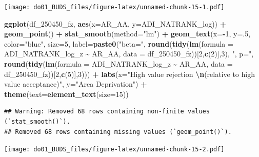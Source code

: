 \documentclass[
]{article}
\newenvironment{Shaded}{\begin{snugshade}}{\end{snugshade}}
\newcommand{\AttributeTok}[1]{\textcolor[rgb]{0.13,0.29,0.53}{#1}}
\newcommand{\DecValTok}[1]{\textcolor[rgb]{0.00,0.00,0.81}{#1}}
\newcommand{\FunctionTok}[1]{\textcolor[rgb]{0.13,0.29,0.53}{\textbf{#1}}}
\newcommand{\NormalTok}[1]{#1}
\newcommand{\SpecialCharTok}[1]{\textcolor[rgb]{0.81,0.36,0.00}{\textbf{#1}}}
\newcommand{\StringTok}[1]{\textcolor[rgb]{0.31,0.60,0.02}{#1}}
\begin{document}
\texttt{[image: do01\_BUDS\_files/figure-latex/unnamed-chunk-15-1.pdf]}

\begin{Shaded}
\begin{Highlighting}[]
\FunctionTok{ggplot}\NormalTok{(df\_250450\_fz, }\FunctionTok{aes}\NormalTok{(}\AttributeTok{x=}\NormalTok{AR\_AA, }\AttributeTok{y=}\NormalTok{ADI\_NATRANK\_log)) }\SpecialCharTok{+}
  \FunctionTok{geom\_point}\NormalTok{() }\SpecialCharTok{+}
  \FunctionTok{stat\_smooth}\NormalTok{(}\AttributeTok{method=}\StringTok{"lm"}\NormalTok{) }\SpecialCharTok{+}
  \FunctionTok{geom\_text}\NormalTok{(}\AttributeTok{x=}\SpecialCharTok{{-}}\DecValTok{1}\NormalTok{, }\AttributeTok{y=}\NormalTok{.}\DecValTok{5}\NormalTok{, }\AttributeTok{color=}\StringTok{"blue"}\NormalTok{, }\AttributeTok{size=}\DecValTok{5}\NormalTok{, }\AttributeTok{label=}\FunctionTok{paste0}\NormalTok{(}\StringTok{"beta="}\NormalTok{,}
       \FunctionTok{round}\NormalTok{(}\FunctionTok{tidy}\NormalTok{(}\FunctionTok{lm}\NormalTok{(}\AttributeTok{formula =}\NormalTok{ ADI\_NATRANK\_log\_z }\SpecialCharTok{\textasciitilde{}}\NormalTok{ AR\_AA, }\AttributeTok{data =}\NormalTok{ df\_250450\_fz))[}\DecValTok{2}\NormalTok{,}\FunctionTok{c}\NormalTok{(}\DecValTok{2}\NormalTok{)],}\DecValTok{3}\NormalTok{),}
       \StringTok{", p="}\NormalTok{, }
       \FunctionTok{round}\NormalTok{(}\FunctionTok{tidy}\NormalTok{(}\FunctionTok{lm}\NormalTok{(}\AttributeTok{formula =}\NormalTok{ ADI\_NATRANK\_log\_z }\SpecialCharTok{\textasciitilde{}}\NormalTok{ AR\_AA, }\AttributeTok{data =}\NormalTok{ df\_250450\_fz))[}\DecValTok{2}\NormalTok{,}\FunctionTok{c}\NormalTok{(}\DecValTok{5}\NormalTok{)],}\DecValTok{3}\NormalTok{))) }\SpecialCharTok{+}
    \FunctionTok{labs}\NormalTok{(}\AttributeTok{x=}\StringTok{"High value rejection }\SpecialCharTok{\textbackslash{}n}\StringTok{(relative to high value acceptance)"}\NormalTok{,}
       \AttributeTok{y=}\StringTok{"Area Deprivation"}\NormalTok{) }\SpecialCharTok{+}
  \FunctionTok{theme}\NormalTok{(}\AttributeTok{text=}\FunctionTok{element\_text}\NormalTok{(}\AttributeTok{size=}\DecValTok{15}\NormalTok{))}
\end{Highlighting}
\end{Shaded}

\begin{verbatim}
## Warning: Removed 68 rows containing non-finite values (`stat_smooth()`).
## Removed 68 rows containing missing values (`geom_point()`).
\end{verbatim}

\texttt{[image: do01\_BUDS\_files/figure-latex/unnamed-chunk-15-2.pdf]}
\end{document}
